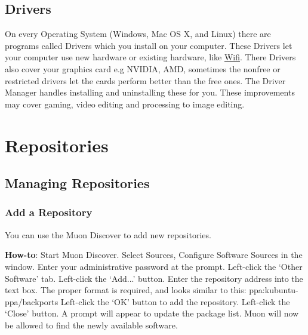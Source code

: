 \documentclass[letterpaper,10pt,english]{sphinxmanual}
\begin{document}
\section{Drivers}
\label{docs/advanced:drivers}
On every Operating System (Windows, Mac OS X, and Linux) there are programs called Drivers which you install on your computer. These Drivers let your computer use new hardware or existing hardware, like \href{https://userbase.kde.org/Kubuntu/Basic\#Wireless}{Wifi}. There Drivers also cover your graphics card e.g NVIDIA, AMD, sometimes the nonfree or restricted drivers let the cards perform better than the free ones. The Driver Manager handles installing and uninstalling these for you. These improvements may cover gaming, video editing and processing to image editing.


\chapter{Repositories}
\label{docs/repositories:repositories-link}\label{docs/repositories:repositories}\label{docs/repositories::doc}

\section{Managing Repositories}
\label{docs/repositories:managing-repositories}

\subsection{Add a Repository}
\label{docs/repositories:add-a-repository}
You can use the Muon Discover to add new repositories.

\textbf{How-to}: Start Muon Discover. Select Sources, Configure Software Sources in the window. Enter your administrative password at the prompt. Left-click the `Other Software' tab. Left-click the `Add...' button. Enter the repository address into the text box. The proper format is required, and looks similar to this: ppa:kubuntu-ppa/backports Left-click the `OK' button to add the repository. Left-click the `Close' button. A prompt will appear to update the package list. Muon will now be allowed to find the newly available software.


\end{document}
